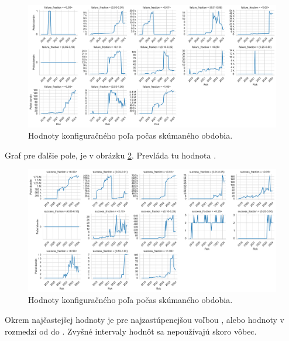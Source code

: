 \begin{figure}[!htb]
\begin{center}
 \includegraphics[scale=0.447]{obrazky-figures/httparchive_nel_config_ff_dist.pdf}
 \caption{Hodnoty konfiguračného poľa  počas skúmaného obdobia.}
 \label{fig:httparchive-nel-config-ff-dist}
\end{center}
\end{figure}

Graf pre ďalšie pole,  je v obrázku \ref{fig:httparchive-nel-config-sf-dist}. 
Prevláda tu hodnota .

\begin{figure}[!htb]
\begin{center}
 \includegraphics[scale=0.447]{obrazky-figures/httparchive_nel_config_sf_dist.pdf}
 \caption{Hodnoty konfiguračného poľa  počas skúmaného obdobia.}
 \label{fig:httparchive-nel-config-sf-dist}
\end{center}
\end{figure}

\pagebreak

Okrem najčastejšej hodnoty je pre  najzastúpenejšou voľbou , alebo hodnoty v rozmedzí od  do .
Zvyšné intervaly hodnôt sa nepoužívajú skoro vôbec.

